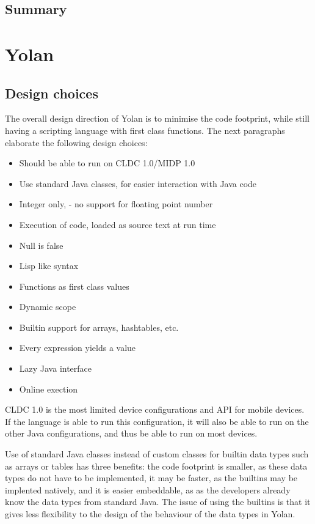 \documentclass[11pt]{report}
\begin{document}
\section{Summary}
\chapter{Yolan}
\label{yolan}
\section{Design choices}
The overall design direction of Yolan is to minimise the code footprint, while still having a scripting language with first class functions.
The next paragraphs elaborate the following design choices:
\begin{itemize}
\item Should be able to run on CLDC 1.0/MIDP 1.0
\item Use standard Java classes, for easier interaction with Java code
\item Integer only, - no support for floating point number
\item Execution of code, loaded as source text at run time
\item Null is false
\item Lisp like syntax
\item Functions as first class values
\item Dynamic scope
\item Builtin support for arrays, hashtables, etc.
\item Every expression yields a value
\item Lazy Java interface
\item Online exection
\end{itemize}

CLDC 1.0 is the most limited device configurations and API for mobile devices. If the language is able to run this configuration, it will also be able to run on the other Java configurations, and thus be able to run on most devices.

Use of standard Java classes instead of custom classes for builtin data types such as arrays or tables has three benefits: the code footprint is smaller, as these data types do not have to be implemented, it may be faster, as the builtins may be implented natively, and it is easier embeddable, as as the developers already know the data types from standard Java.
The issue of using the builtins is that it gives less flexibility to the design of the behaviour of the data types in Yolan.
\end{document}

